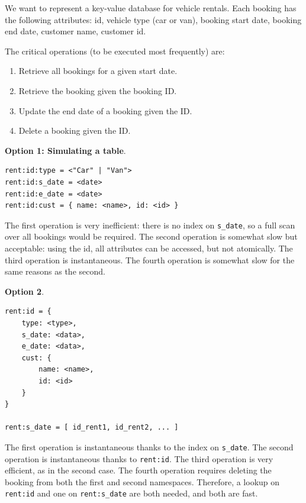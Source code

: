 \begin{example}{}
We want to represent a key-value database for vehicle rentals.
Each booking has the following attributes: id, vehicle type (car or van), booking start date, booking end date, customer name, customer id.

The critical operations (to be executed most frequently) are:
\begin{enumerate}
    \item Retrieve all bookings for a given start date.
    \item Retrieve the booking given the booking ID.
    \item Update the end date of a booking given the ID.
    \item Delete a booking given the ID.
\end{enumerate}

\vspace{2mm}
\textbf{Option 1: Simulating a table}.

\begin{verbatim}
rent:id:type = <"Car" | "Van">
rent:id:s_date = <date>
rent:id:e_date = <date>
rent:id:cust = { name: <name>, id: <id> }
\end{verbatim}

The first operation is very inefficient: there is no index on \texttt{s\_date}, so a full scan over all bookings would be required.
The second operation is somewhat slow but acceptable: using the id, all attributes can be accessed, but not atomically.
The third operation is instantaneous.
The fourth operation is somewhat slow for the same reasons as the second.

\vspace{2mm}
\textbf{Option 2}.

\begin{verbatim}
rent:id = { 
    type: <type>, 
    s_date: <data>, 
    e_date: <data>, 
    cust: { 
        name: <name>, 
        id: <id> 
    } 
}

rent:s_date = [ id_rent1, id_rent2, ... ]
\end{verbatim}

The first operation is instantaneous thanks to the index on \texttt{s\_date}.
The second operation is instantaneous thanks to \texttt{rent:id}.
The third operation is very efficient, as in the second case.
The fourth operation requires deleting the booking from both the first and second namespaces. Therefore, a lookup on \texttt{rent:id} and one on \texttt{rent:s\_date} are both needed, and both are fast.


\end{example}
